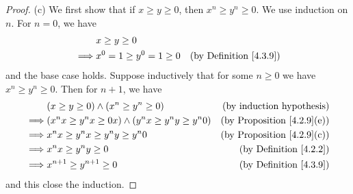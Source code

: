 \begin{proof}{(c)}
    We first show that if \(x \geq y \geq 0\), then \(x^n \geq y^n \geq 0\).
    We use induction on \(n\).
    For \(n = 0\), we have
    \begin{align*}
                 & x \geq y \geq 0                                                  \\
        \implies & x^0 = 1 \geq y^0 = 1 \geq 0 & \text{(by Definition \ref{4.3.9})}
    \end{align*}
    and the base case holds.
    Suppose inductively that for some \(n \geq 0\) we have \(x^n \geq y^n \geq 0\).
    Then for \(n + 1\), we have
    \begin{align*}
                 & (x \geq y \geq 0) \land (x^n \geq y^n \geq 0)                  & \text{(by induction hypothesis)}       \\
        \implies & (x^n x \geq y^n x \geq 0x) \land (y^n x \geq y^n y \geq y^n 0) & \text{(by Proposition \ref{4.2.9}(e))} \\
        \implies & x^n x \geq y^n x \geq y^n y \geq y^n 0                         & \text{(by Proposition \ref{4.2.9}(c))} \\
        \implies & x^n x \geq y^n y \geq 0                                        & \text{(by Definition \ref{4.2.2})}     \\
        \implies & x^{n + 1} \geq y^{n + 1} \geq 0                                & \text{(by Definition \ref{4.3.9})}
    \end{align*}
    and this close the induction.


\end{proof}
